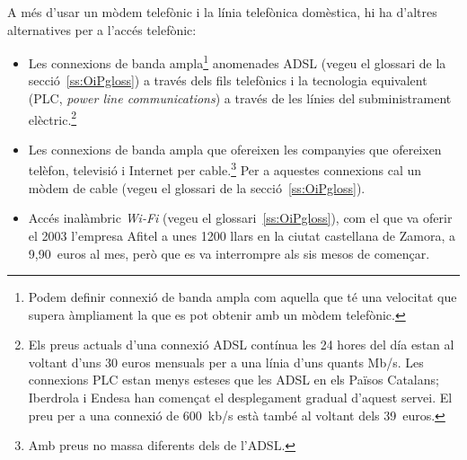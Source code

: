 A més d'usar un mòdem telefònic i la línia telefònica domèstica, hi ha
d'altres alternatives per a l'accés telefònic:
  \begin{itemize}
  \item Les connexions de banda ampla\footnote{Podem definir connexió
      de banda ampla com aquella que té una velocitat que supera
      àmpliament la que es pot obtenir amb un mòdem telefònic.}
    anomenades ADSL (vegeu el glossari de la secció~\ref{ss:OiPgloss})
    a través dels fils telefònics i la tecnologia equivalent (PLC,
    \emph{power line communications}) a través de les línies del
    subministrament elèctric.\footnote{Els preus actuals d'una
      connexió ADSL contínua les 24 hores del día estan al voltant
      d'uns 30 euros mensuals per a una línia d'uns quants Mb/s. Les
      connexions PLC estan menys esteses que les ADSL en els Països
      Catalans; Iberdrola i Endesa han començat el desplegament
      gradual d'aquest servei. El preu per a una connexió de 600~kb/s
      està també al voltant dels 39~euros.}
  \item Les connexions de banda ampla que ofereixen les companyies que
    ofereixen telèfon, televisió i Internet per cable.\footnote{Amb preus no
      massa diferents dels de l'ADSL.} Per a aquestes connexions cal un mòdem
    de cable (vegeu el glossari de la secció~\ref{ss:OiPgloss}).
   \item Accés inalàmbric \emph{Wi-Fi} (vegeu el glossari~\ref{ss:OiPgloss}),
     com el que va oferir el 2003 l'empresa Afitel a unes 1200 llars en la
     ciutat castellana de Zamora, a 9,90~euros al mes, però que es va
     interrompre als sis mesos de començar.
  \end{itemize}

